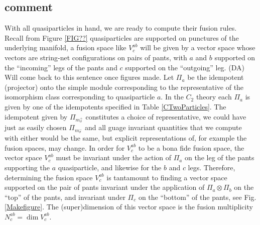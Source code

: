 \documentclass[12pt,a4paper]{article}
\newcommand{\tp}{\otimes}
\newcommand{\dave}[1]{{\color{ao(english)}\footnotesize{(DA) #1}}}
\begin{document}
\subsection{comment}
With all quasiparticles in hand, we are ready to compute their fusion rules. Recall from Figure \ref{FIG??} quasiparticles are supported on punctures of the underlying manifold, a fusion space like $V^{ab}_c$ will be given by a vector space whose vectors are string-net configurations on pairs of pants, 
with $a$ and $b$ supported on the ``incoming'' legs of the pants and $c$ supported on the ``outgoing'' leg. 
\dave{Will come back to this sentence once figures made.}
Let $\Pi_a$ be the idempotent (projector) onto the simple module corresponding to the representative of the isomorphism class corresponding to quasiparticle $a$.
In the $C_2$ theory each $\Pi_a$ is given by one of the idempotents specified in Table \ref{CTwoParticles}.
The idempotent given by $\Pi_{m_\sigma^+}$ constitutes a choice of representative, we could have just as easily chosen $\Pi_{m_\sigma^-}$ and all guage invariant quantities that we compute with either would be the same, but explicit representations of, for example the fusion spaces, may change.
In order for $V^{ab}_c$ to be a bona fide fusion space, the vector space $V^{ab}_c$ must be invariant under the action of $\Pi_a$ on the leg of the pants supporting the $a$ quasiparticle, and likewise for the $b$ and $c$ legs. Therefore, determining the fusion space $V^{ab}_c$ is tantamount to finding a vector space supported on the pair of pants invariant under the application of $\Pi_a\tp \Pi_b$ on the ``top'' of the pants, and invariant under $\Pi_c$ on the ``bottom'' of the pants, see Fig. \ref{Makefigure}.
The (super)dimension of this vector space is the fusion multiplicity $N^{ab}_c = \dim V^{ab}_c$. 
 
 


 
\end{document}
